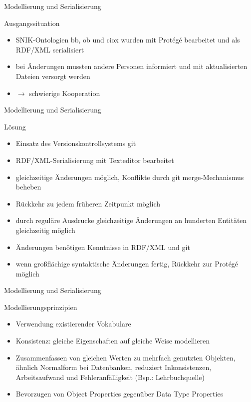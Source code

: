 \documentclass[14pt,aspectratio=1610]{beamer}
\begin{document}
\begin{frame}{Modellierung und Serialisierung}
\begin{block}{Ausgangssituation}
\begin{itemize}
\item SNIK-Ontologien bb, ob und ciox wurden mit Protégé bearbeitet und als RDF/XML serialisiert
\item bei Änderungen mussten andere Personen informiert und mit aktualisierten Dateien versorgt werden 
\item $\rightarrow$ schwierige Kooperation 
\end{itemize}
\end{block}
\end{frame}

\begin{frame}{Modellierung und Serialisierung}
\begin{block}{Lösung}
\begin{itemize}
\item Einsatz des Versionskontrollsystems git
\item RDF/XML-Serialisierung mit Texteditor bearbeitet
\item gleichzeitige Änderungen möglich, Konflikte durch git merge-Mechanismus beheben
\item Rückkehr zu jedem früheren Zeitpunkt möglich
\item durch reguläre Ausdrucke gleichzeitige Änderungen an hunderten Entitäten gleichzeitig möglich
\item Änderungen benötigen Kenntnisse in RDF/XML und git
\item wenn großflächige syntaktische Änderungen fertig, Rückkehr zur Protégé möglich
\end{itemize}
\end{block}
\end{frame}

\begin{frame}{Modellierung und Serialisierung}
\begin{block}{Modellierungsprinzipien}
\begin{itemize}
\item Verwendung existierender Vokabulare
\item Konsistenz: gleiche Eigenschaften auf gleiche Weise modellieren
\item Zusammenfassen von gleichen Werten zu mehrfach genutzten Objekten, ähnlich Normalform bei Datenbanken, reduziert Inkonsistenzen, Arbeitsaufwand und Fehleranfälligkeit (Bsp.: Lehrbuchquelle)
\item Bevorzugen von Object Properties gegenüber Data Type Properties
\end{itemize}
\end{block}
\end{frame}
\end{document}
